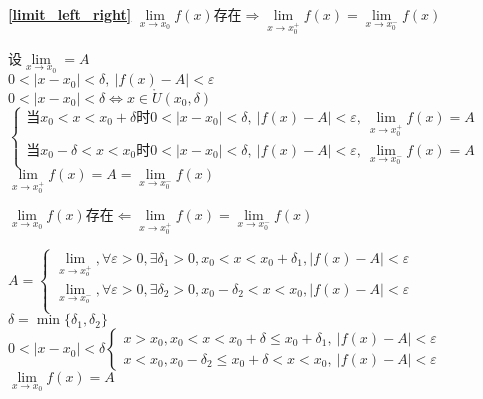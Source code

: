 \textbf{\large \ref{limit_left_right}}
$\lim\limits_{x\to x_0}f(x)\mbox{存在}\Rightarrow \lim\limits_{x\to x_0^+}f(x)=\lim\limits_{x\to x_0^-}f(x)$
\begin{center}
    设$\lim\limits_{x\to x_0}=A$\\
    $0<\left|x-x_0\right|<\delta,\ \left|f(x)-A\right|<\varepsilon$\\
    $0<\left|x-x_0\right|<\delta\Leftrightarrow x\in \mathring{U}(x_0,\delta)$
    $\begin{cases}
        \mbox{当}x_0<x<x_0+\delta\mbox{时}0<\left|x-x_0\right|<\delta,\ \left|f(x)-A\right|<\varepsilon,\ \lim\limits_{x\to x_0^+}f(x)=A\\
        \mbox{当}x_0-\delta<x<x_0\mbox{时}0<\left|x-x_0\right|<\delta,\ \left|f(x)-A\right|<\varepsilon,\ \lim\limits_{x\to x_0^-}f(x)=A
    \end{cases}$
    $\lim\limits_{x\to x_0^+}f(x)=A =\lim\limits_{x\to x_0^-}f(x)$
\end{center}
$\lim\limits_{x\to x_0}f(x)\mbox{存在}\Leftarrow\lim\limits_{x\to x_0^+}f(x)=\lim\limits_{x\to x_0^-}f(x)$
\begin{center}
    $A=\begin{cases}
    \lim\limits_{x\to x_o^+},\forall\varepsilon>0,\exists\delta_1>0,x_0<x<x_0+\delta_1,\left|f(x)-A\right|<\varepsilon\\
    \lim\limits_{x\to x_o^-},\forall\varepsilon>0,\exists\delta_2>0,x_0-\delta_2<x<x_0,\left|f(x)-A\right|<\varepsilon\\
    \end{cases}$\\
    $\delta = \min\{\delta_1,\delta_2\}$\\
    $0<\left|x-x_0\right|<\delta\begin{cases}
        x>x_0,x_0<x<x_0+\delta\leqslant x_0+\delta_1,\  \left|f(x)-A\right|<\varepsilon\\
        x<x_0,x_0-\delta_2\leqslant x_0+\delta<x<x_0,\ \left|f(x)-A\right|<\varepsilon
    \end{cases}$\\
    $\lim\limits_{x\to x_0}f(x)=A$
\end{center}

